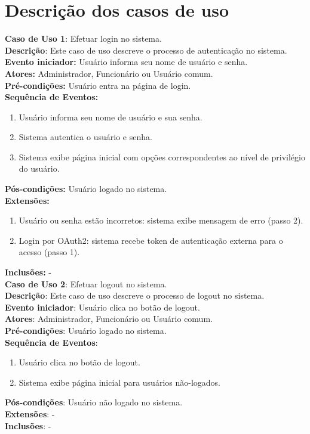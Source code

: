 \documentclass[]{politex}
\begin{document}
\section{Descrição dos casos de uso}
\noindent \textbf{Caso de Uso 1}: Efetuar login no sistema. \\
\textbf{Descrição}: Este caso de uso descreve o processo de autenticação no sistema. \\
\textbf{Evento iniciador:} Usuário informa seu nome de usuário e senha. \\
\textbf{Atores:} Administrador, Funcionário ou Usuário comum. \\
\textbf{Pré-condições:} Usuário entra na página de login. \\
\textbf{Sequência de Eventos:}
\begin{enumerate}
\item Usuário informa seu nome de usuário e sua senha.
\item Sistema autentica o usuário e senha.
\item Sistema exibe página inicial com opções correspondentes ao nível de privilégio do usuário.
\end{enumerate}
\textbf{Pós-condições:} Usuário logado no sistema. \\
\textbf{Extensões:} 
\begin{enumerate}
\item Usuário ou senha estão incorretos: sistema exibe mensagem de erro (passo 2).
\item Login por OAuth2: sistema recebe token de autenticação externa para o acesso (passo 1). 
\end{enumerate}
\textbf{Inclusões:} - \\

\noindent \textbf{Caso de Uso 2}: Efetuar logout no sistema. \\
\textbf{Descrição}: Este caso de uso descreve o processo de logout no sistema. \\
\textbf{Evento iniciador}: Usuário clica no botão de logout. \\
\textbf{Atores}: Administrador, Funcionário ou Usuário comum. \\
\textbf{Pré-condições}: Usuário logado no sistema. \\
\textbf{Sequência de Eventos}: 
\begin{enumerate}
\item Usuário clica no botão de logout.
\item Sistema exibe página inicial para usuários não-logados.
\end{enumerate}
\textbf{Pós-condições}: Usuário não logado no sistema. \\
\textbf{Extensões}: - \\
\textbf{Inclusões}: - \\
\end{document}
